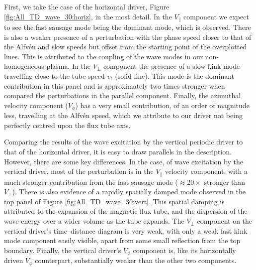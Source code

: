 First, we take the case of the horizontal driver, Figure \ref{fig:All_TD_wave_30:horiz}, in the most detail. 
 In the $V_\parallel$ component we expect to see the fast sausage mode being the dominant mode, which is observed.
 There is also a weaker presence of a perturbation with the phase speed closer to that of the Alfv\'en and slow speeds but offset from the starting point of the overplotted lines.
 This is attributed to the coupling of the wave modes in our non-homogeneous plasma.
 In the $V_\perp$ component the presence of a slow kink mode travelling close to the tube speed $v_t$ (solid line).
 This mode is the dominant contribution in this panel and is approximately two times stronger when compared the perturbations in the parallel component. 
 Finally, the azimuthal velocity component ($V_\phi$) has a very small contribution, of an order of magnitude less, travelling at the Alfv\'en speed, which we attribute to our driver not being perfectly centred upon the flux tube axis.

Comparing the results of the wave excitation by the vertical periodic driver to that of the horizontal driver, it is easy to draw parallels in the description.
 However, there are some key differences. 
 In the case, of wave excitation by the vertical driver, most of the perturbation is in the $V_\parallel$ velocity component, with a much stronger contribution from the fast sausage mode ($\approx 20 \times$ stronger than $V_\perp$).
 There is also evidence of a rapidly spatially damped mode observed in the top panel of Figure \ref{fig:All_TD_wave_30:vert}.
 This spatial damping is attributed to the expansion of the magnetic flux tube, and the dispersion of the wave energy over a wider volume as the tube expands.
 The $V_\perp$ component on the vertical driver's time--distance diagram is very weak, with only a weak fast kink mode component easily visible, apart from some small reflection from the top boundary. 
 Finally, the vertical driver's $V_\phi$ component is, like its horizontally driven $V_\phi$ counterpart, substantially weaker than the other two components.

